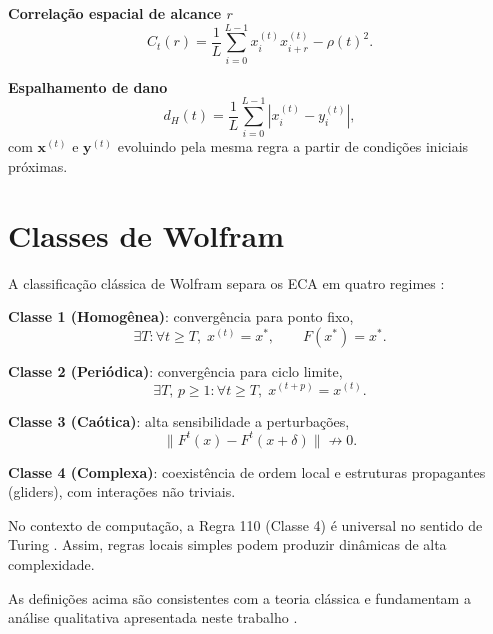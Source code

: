 \textbf{Correlação espacial de alcance \(r\)}
\[
C_t(r)=\frac{1}{L}\sum_{i=0}^{L-1}x_i^{(t)}x_{i+r}^{(t)}-\rho(t)^2.
\]

\textbf{Espalhamento de dano}
\[
d_H(t)=\frac{1}{L}\sum_{i=0}^{L-1}\left|x_i^{(t)}-y_i^{(t)}\right|,
\]
com \(\mathbf{x}^{(t)}\) e \(\mathbf{y}^{(t)}\) evoluindo pela mesma regra a partir de condições iniciais próximas.

\section{Classes de Wolfram}

A classificação clássica de Wolfram separa os ECA em quatro regimes \cite{wolfram1983,wolfram2002}:

\textbf{Classe 1 (Homogênea)}: convergência para ponto fixo,
\[
\exists T:\forall t\ge T,\; x^{(t)}=x^*, \qquad F(x^*)=x^*.
\]

\textbf{Classe 2 (Periódica)}: convergência para ciclo limite,
\[
\exists T,\,p\ge 1:\forall t\ge T,\; x^{(t+p)}=x^{(t)}.
\]

\textbf{Classe 3 (Caótica)}: alta sensibilidade a perturbações,
\[
\|F^t(x)-F^t(x+\delta)\|\not\to 0.
\]

\textbf{Classe 4 (Complexa)}: coexistência de ordem local e estruturas propagantes (gliders), com interações não triviais.

No contexto de computação, a Regra 110 (Classe 4) é universal no sentido de Turing \cite{cook2004}. Assim, regras locais simples podem produzir dinâmicas de alta complexidade.

As definições acima são consistentes com a teoria clássica e fundamentam a análise qualitativa apresentada neste trabalho \cite{wolfram1983,wolfram2002,langton1990,li1990}.
